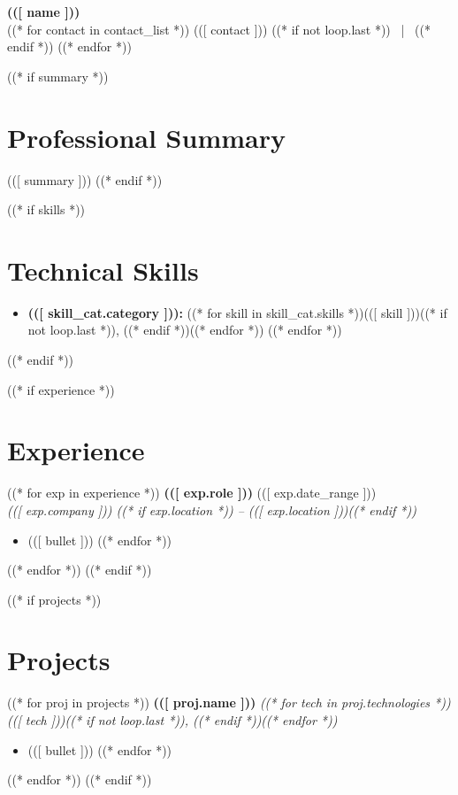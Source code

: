 \documentclass[10pt,letterpaper]{article}
\begin{document}
\begin{center}
    {\Huge \textbf{\color{primary} (([ name ]))} } \\
    \vspace{4pt}
    \small \color{secondary}
    ((* for contact in contact_list *))
        (([ contact ]))
        ((* if not loop.last *)) \ | \ ((* endif *))
    ((* endfor *))
\end{center}

((* if summary *))
\section{Professional Summary}
(([ summary ]))
((* endif *))

((* if skills *))
\section{Technical Skills}
\begin{itemize}[leftmargin=0.5em, label={}, noitemsep, topsep=2pt]
    ((* for skill_cat in skills *))
    \item \textbf{(([ skill_cat.category ])):} ((* for skill in skill_cat.skills *))(([ skill ]))((* if not loop.last *)), ((* endif *))((* endfor *))
    ((* endfor *))
\end{itemize}
((* endif *))

((* if experience *))
\section{Experience}
((* for exp in experience *))
\textbf{(([ exp.role ]))} \hfill (([ exp.date_range ])) \\
\textit{(([ exp.company ])) ((* if exp.location *)) -- (([ exp.location ]))((* endif *))}
\begin{itemize}[noitemsep,topsep=2pt,leftmargin=1.5em]
    ((* for bullet in exp.highlights *))
    \item (([ bullet ]))
    ((* endfor *))
\end{itemize}
\vspace{5pt}
((* endfor *))
((* endif *))

((* if projects *))
\section{Projects}
((* for proj in projects *))
\textbf{(([ proj.name ]))} \hfill \textit{((* for tech in proj.technologies *))(([ tech ]))((* if not loop.last *)), ((* endif *))((* endfor *))}
\begin{itemize}[noitemsep,topsep=2pt,leftmargin=1.5em]
    ((* for bullet in proj.highlights *))
    \item (([ bullet ]))
    ((* endfor *))
\end{itemize}
\vspace{5pt}
((* endfor *))
((* endif *))
\end{document}
